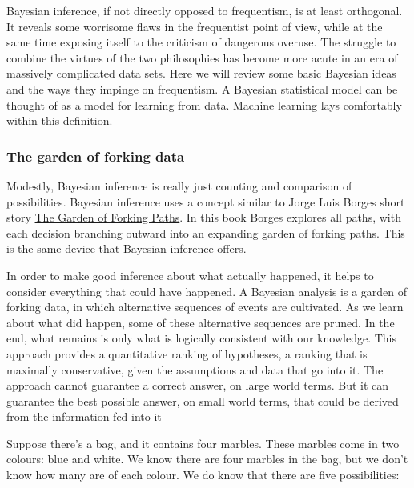 \documentclass{article}
\begin{document}
Bayesian inference, if not directly opposed to frequentism, is at least
orthogonal. It reveals some worrisome flaws in the frequentist point of
view, while at the same time exposing itself to the criticism of
dangerous overuse. The struggle to combine the virtues of the two
philosophies has become more acute in an era of massively complicated
data sets. Here we will review some basic Bayesian ideas and the ways
they impinge on frequentism. A Bayesian statistical model can be thought
of as a model for learning from data. Machine learning lays comfortably
within this definition.

\hypertarget{the-garden-of-forking-data}{%
\subsubsection{The garden of forking
data}\label{the-garden-of-forking-data}}

Modestly, Bayesian inference is really just counting and comparison of
possibilities. Bayesian inference uses a concept similar to Jorge Luis
Borges short story
\href{https://en.wikipedia.org/wiki/The_Garden_of_Forking_Paths}{The
Garden of Forking Paths}. In this book Borges explores all paths, with
each decision branching outward into an expanding garden of forking
paths. This is the same device that Bayesian inference offers.

In order to make good inference about what actually happened, it helps
to consider everything that could have happened. A Bayesian analysis is
a garden of forking data, in which alternative sequences of events are
cultivated. As we learn about what did happen, some of these alternative
sequences are pruned. In the end, what remains is only what is logically
consistent with our knowledge. This approach provides a quantitative
ranking of hypotheses, a ranking that is maximally conservative, given
the assumptions and data that go into it. The approach cannot guarantee
a correct answer, on large world terms. But it can guarantee the best
possible answer, on small world terms, that could be derived from the
information fed into it

Suppose there's a bag, and it contains four marbles. These marbles come
in two colours: blue and white. We know there are four marbles in the
bag, but we don't know how many are of each colour. We do know that
there are five possibilities:
\end{document}
